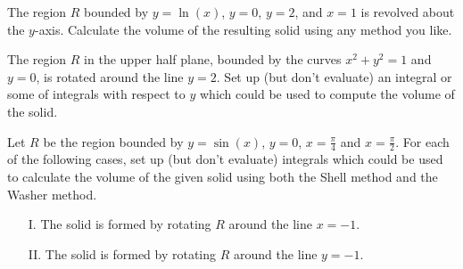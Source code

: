 \documentclass[handout]{ximera}
\begin{document}
\begin{problem}
The region $R$ bounded by $y=\ln(x)$, $y=0$, $y=2$, and $x=1$ is revolved about the $y$-axis. Calculate the volume of the resulting solid using any method you like.
\end{problem}

\begin{freeResponse}

\end{freeResponse}

\begin{problem}
The region $R$ in the upper half plane, bounded by the curves $x^2+y^2 = 1$ and $y=0$, is rotated around the line $y=2$. Set up (but don't evaluate) an integral or some of integrals with respect to $y$ which could be used to compute the volume of the solid.
\end{problem}

\begin{freeResponse}

\end{freeResponse}

\begin{problem}
Let $R$ be the region bounded by $y=\sin (x)$, $y=0$, $x=\frac{\pi}{4}$ and $x = \frac{\pi}{2}$. For each of the following cases, set up (but don't evaluate) integrals which could be used to calculate the volume of the given solid using both the Shell method and the Washer method.

\begin{enumerate}
\item[I.] The solid is formed by rotating $R$ around the line $x = -1$.
\item[II.] The solid is formed by rotating $R$ around the line $y=-1$.
\end{enumerate}
\end{problem}

\begin{freeResponse}

\end{freeResponse}
\end{document}
